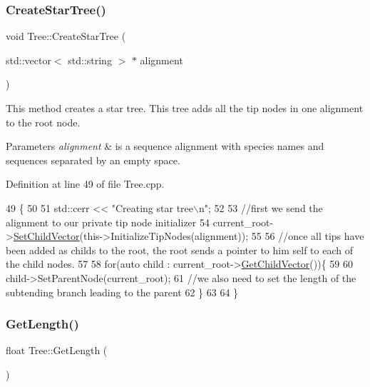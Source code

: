 \subsubsection{\texorpdfstring{Create\+Star\+Tree()}{CreateStarTree()}}
{\footnotesize\ttfamily void Tree\+::\+Create\+Star\+Tree (\begin{DoxyParamCaption}\item[{std\+::vector$<$ std\+::string $>$ $\ast$}]{alignment }\end{DoxyParamCaption})}

This method creates a star tree. This tree adds all the tip nodes in one alignment to the root node.


\begin{DoxyParams}{Parameters}
{\em alignment} & is a sequence alignment with species names and sequences separated by an empty space. \\
\hline
\end{DoxyParams}


Definition at line 49 of file Tree.\+cpp.


\begin{DoxyCode}
49                                                         \{
50   
51   std::cerr << \textcolor{stringliteral}{"Creating star tree\(\backslash\)n"};
52   
53   \textcolor{comment}{//first we send the alignment to our private tip node initializer}
54   current\_root->\hyperlink{classNode_a7480924f7879b04fe8c787f42ee888fe}{SetChildVector}(this->InitializeTipNodes(alignment));
55   
56   \textcolor{comment}{//once all tips have been added as childs to the root, the root sends a pointer to him self to each of
       the child nodes.}
57   
58   \textcolor{keywordflow}{for}(\textcolor{keyword}{auto} child : current\_root->\hyperlink{classNode_a9b9823315fd95dcd24aac97316de2859}{GetChildVector}())\{
59     
60     child->SetParentNode(current\_root);
61     \textcolor{comment}{//we also need to set the length of the subtending branch leading to the parent}
62   \}
63   
64 \}
\end{DoxyCode}
\mbox{\label{classTree_a5812392cfc9ed68d1fc3713d708a5e8f}} 
\subsubsection{\texorpdfstring{Get\+Length()}{GetLength()}}
{\footnotesize\ttfamily float Tree\+::\+Get\+Length (\begin{DoxyParamCaption}{ }\end{DoxyParamCaption})}




